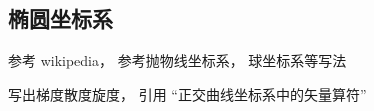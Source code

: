 \begin{issues}
\issueDraft
\end{issues}
\subsection{椭圆坐标系}
参考 wikipedia， 参考抛物线坐标系， 球坐标系等写法

写出梯度散度旋度， 引用 “正交曲线坐标系中的矢量算符”
